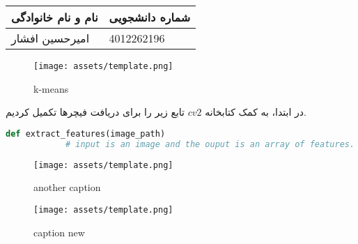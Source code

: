 \documentclass[a4paper,12pt]{article}
\begin{document}
	
	\begin{table}[h]
		\centering
		\begin{tabular}{|l|l|}
			\hline
			\textbf{نام و نام خانوادگی} & \textbf{شماره دانشجویی} \\
			\hline
			امیرحسین افشار & 4012262196 \\
			\hline
		\end{tabular}
	\end{table}
	
	
	
	\begin{figure}[h]
		\centering
		\texttt{[image: assets/template.png]}
		\caption*{\textcolor{CustomAccent}{k-means}}
	\end{figure}
	
	\pagebreak
	
	در ابتدا، به کمک کتابخانه 
	$cv2$
	تابع زیر را برای دریافت فیچرها تکمیل کردیم. 
	
	\begin{latin}
		\begin{lstlisting}[language=Python, caption={extract feature function}]
			def extract_features(image_path)
			# input is an image and the ouput is an array of features.
		\end{lstlisting}
	\end{latin}
	
	


	\begin{figure}[ht]
		\centering
		\begin{minipage}[t]{0.48\textwidth}
			\centering
			\texttt{[image: assets/template.png]}
			\caption{\textcolor{CustomAccent}{another caption}}
		\end{minipage}
		\hfill
		\begin{minipage}[t]{0.48\textwidth}
			\centering
			\texttt{[image: assets/template.png]}
			\caption{\textcolor{CustomAccent}{caption new}}
		\end{minipage}
		\vspace{1em}
	\end{figure}
\end{document}
